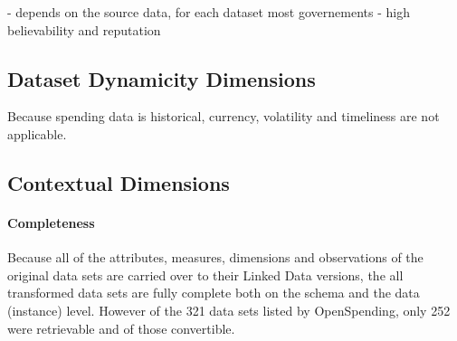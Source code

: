 \documentclass[sw]{iosart2x}
\begin{document}
- depends on the source data, for each dataset
most governements - high believability and reputation

\subsection{Dataset Dynamicity Dimensions}
Because spending data is historical, currency, volatility and timeliness are not applicable.
\fi
\subsection{Contextual Dimensions}
\paragraph{Completeness}
Because all of the attributes, measures, dimensions and observations of the original data sets are carried over to their Linked Data versions, the all transformed data sets are fully complete both on the schema and the data (instance) level. 
However of the 321 data sets listed by OpenSpending, only \num{252} were retrievable and \numberofdatasets{} of those convertible.

\iffalse
\begin{figure}[h]
\texttt{[image: img/pointcloud.pdf]}
\caption{Numbers of triples and observations of the data sets (logarithmic scales)}
\label{fig:amountofdata}
\end{figure}
\fi
\iffalse
old data:
\fi

\end{document}
